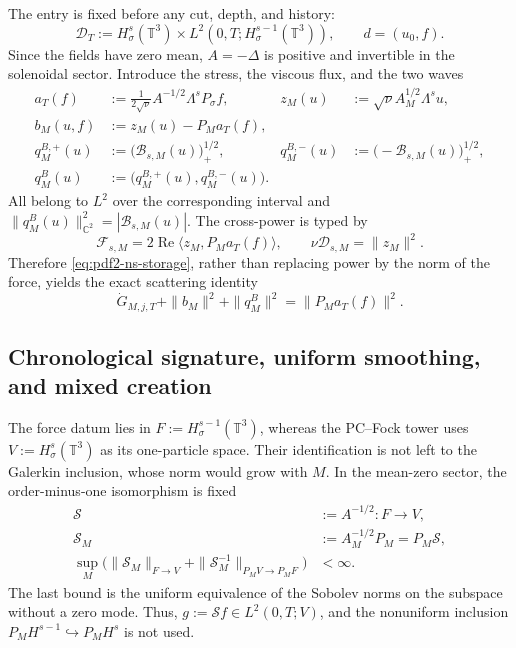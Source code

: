 The entry is fixed before any cut, depth, and history:
\begin{equation}\label{eq:pdf2-ns-data-space}
 \mathcal D_T:=H^s_\sigma(\mathbb T^3)
 \times L^2(0,T;H^{s-1}_\sigma(\mathbb T^3)),
 \qquad d=(u_0,f).
\end{equation}
Since the fields have zero mean, $A=-\Delta$ is positive and invertible in the
solenoidal sector. Introduce the stress, the viscous flux, and the two waves
\begin{equation}\label{eq:pdf2-ns-force-waves}
 \begin{aligned}
 a_T(f)&:=\frac{1}{2\sqrt\nu}A^{-1/2}\Lambda^sP_\sigma f,
 &z_M(u)&:=\sqrt\nu A_M^{1/2}\Lambda^su,\\
 b_M(u,f)&:=z_M(u)-P_Ma_T(f),\\
 q_M^{B,+}(u)&:=\bigl(\mathscr B_{s,M}(u)\bigr)_+^{1/2},
 &q_M^{B,-}(u)&:=\bigl(-\mathscr B_{s,M}(u)\bigr)_+^{1/2},\\
 q_M^B(u)&:=\bigl(q_M^{B,+}(u),q_M^{B,-}(u)\bigr).
 \end{aligned}
\end{equation}
All belong to $L^2$ over the corresponding interval and
$\|q_M^B(u)\|_{\mathbb C^2}^2=|\mathscr B_{s,M}(u)|$.
The cross-power is typed by
\begin{equation}\label{eq:pdf2-ns-cross-power}
 \mathscr F_{s,M}=2\operatorname{Re}\langle z_M,P_Ma_T(f)\rangle,
 \qquad \nu\mathscr D_{s,M}=\|z_M\|^2.
\end{equation}
Therefore \eqref{eq:pdf2-ns-storage}, rather than replacing power by the
norm of the force, yields the exact scattering identity
\begin{equation}\label{eq:pdf2-ns-scattering-balance}
 \dot G_{M,j,T}+\|b_M\|^2+\|q^B_M\|^2=\|P_Ma_T(f)\|^2.
\end{equation}

\subsection{Chronological signature, uniform smoothing, and mixed creation}

The force datum lies in $F:=H^{s-1}_\sigma(\mathbb T^3)$, whereas the
PC--Fock tower uses
$V:=H^s_\sigma(\mathbb T^3)$ as its one-particle space. Their identification is not left to the
Galerkin inclusion, whose norm would grow with $M$. In the mean-zero sector,
the order-minus-one isomorphism is fixed
\begin{equation}\label{eq:pdf2-ns-uniform-smoother}
 \begin{aligned}
 \mathscr S&:=A^{-1/2}:F\longrightarrow V,\\
 \mathscr S_M&:=A_M^{-1/2}P_M=P_M\mathscr S,\\
 \sup_M\bigl(\|\mathscr S_M\|_{F\to V}
 +\|\mathscr S_M^{-1}\|_{P_MV\to P_MF}\bigr)&<\infty.
 \end{aligned}
\end{equation}
The last bound is the uniform equivalence of the Sobolev norms on the
subspace without a zero mode. Thus, $g:=\mathscr Sf\in L^2(0,T;V)$, and the
nonuniform inclusion $P_MH^{s-1}\hookrightarrow P_MH^s$ is not used.

